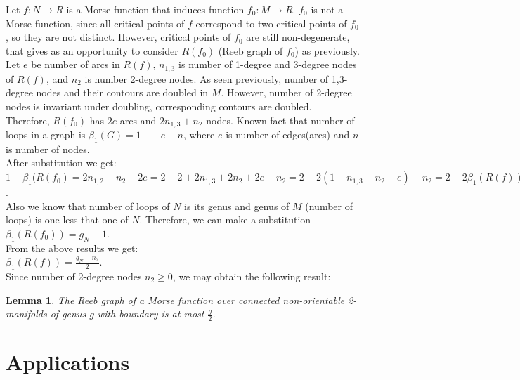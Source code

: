\documentclass[]{article}
\newtheorem{lemma}{Lemma}
\begin{document}
Let $f: N \rightarrow R$ is a Morse function that induces function $f_0: M \rightarrow R$. $f_0$ is not a Morse function, since all critical points of $f$ correspond to two critical points of $f_0$, so they are not distinct. However, critical points of $f_0$ are still non-degenerate, that gives as an opportunity to consider $R(f_0)$ (Reeb graph of $f_0$) as previously. \\
Let $e$ be number of arcs in $R(f)$, $n_{1,3}$ is number of 1-degree and 3-degree nodes of $R(f)$, and $n_2$ is number 2-degree nodes. As seen previously, number of 1,3-degree nodes and their contours are doubled in $M$. However, number of 2-degree nodes is invariant under doubling, corresponding contours are doubled. \\
Therefore, $R(f_0)$ has $2e$ arcs and $2n_{1,3}+n_2$ nodes. Known fact that number of loops in a graph is $\beta_1 (G)=1-+e-n$, where $e$ is number of edges(arcs) and $n$ is number of nodes. \\
After substitution we get:\\
$1-\beta_1(R(f_0)=2n_{1,2}+n_2-2e=2-2+2n_{1,3}+2n_2+2e-n_2=2-2(1-n_{1,3}-n_2+e)-n_2=2-2\beta_1(R(f))-n_2$. \\
Also we know that number of loops of $N$ is its genus and genus of $M$ (number of loops) is one less that one of $N$. Therefore, we can make a substitution $\beta_1(R(f_0))=g_N-1$. \\
From the above results we get: \\
$\beta_1(R(f))=\frac{g_N-n_2}{2}$.\\
Since number of 2-degree nodes $n_2\geq0 $, we may obtain the following result:\\
\begin{lemma}
The Reeb graph of a Morse function over connected non-orientable 2-manifolds of genus $g$ with boundary is at most $\frac{g}{2}$.\\
\end{lemma}

\section{Applications}
\end{document}
